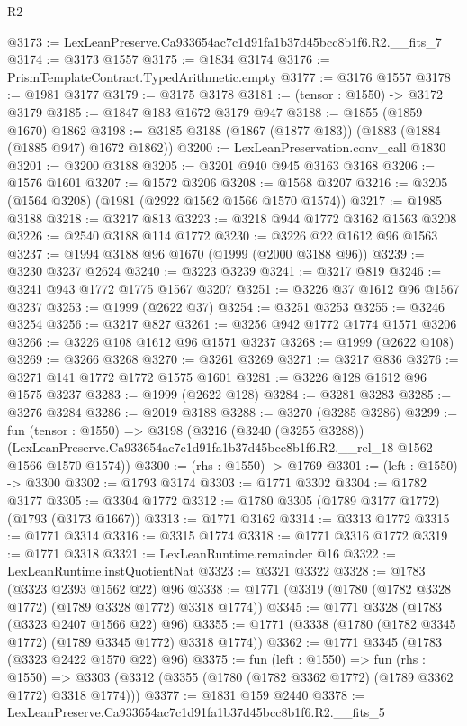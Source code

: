 \begin{lexlean}{R2}
\begin{coremodule}
@3173 := LexLeanPreserve.Ca933654ac7c1d91fa1b37d45bcc8b1f6.R2.__fits_7
@3174 := @3173 @1557
@3175 := @1834 @3174
@3176 := PrismTemplateContract.TypedArithmetic.empty
@3177 := @3176 @1557
@3178 := @1981 @3177
@3179 := @3175 @3178
@3181 := (tensor : @1550) -> @3172 @3179
@3185 := @1847 @183 @1672 @3179 @947
@3188 := @1855 (@1859 @1670) @1862
@3198 := @3185 @3188 (@1867 (@1877 @183)) (@1883 (@1884 (@1885 @947) @1672 @1862))
@3200 := LexLeanPreservation.conv_call @1830
@3201 := @3200 @3188
@3205 := @3201 @940 @945 @3163 @3168
@3206 := @1576 @1601
@3207 := @1572 @3206
@3208 := @1568 @3207
@3216 := @3205 (@1564 @3208) (@1981 (@2922 @1562 @1566 @1570 @1574))
@3217 := @1985 @3188
@3218 := @3217 @813
@3223 := @3218 @944 @1772 @3162 @1563 @3208
@3226 := @2540 @3188 @114 @1772
@3230 := @3226 @22 @1612 @96 @1563
@3237 := @1994 @3188 @96 @1670 (@1999 (@2000 @3188 @96))
@3239 := @3230 @3237 @2624
@3240 := @3223 @3239
@3241 := @3217 @819
@3246 := @3241 @943 @1772 @1775 @1567 @3207
@3251 := @3226 @37 @1612 @96 @1567 @3237
@3253 := @1999 (@2622 @37)
@3254 := @3251 @3253
@3255 := @3246 @3254
@3256 := @3217 @827
@3261 := @3256 @942 @1772 @1774 @1571 @3206
@3266 := @3226 @108 @1612 @96 @1571 @3237
@3268 := @1999 (@2622 @108)
@3269 := @3266 @3268
@3270 := @3261 @3269
@3271 := @3217 @836
@3276 := @3271 @141 @1772 @1772 @1575 @1601
@3281 := @3226 @128 @1612 @96 @1575 @3237
@3283 := @1999 (@2622 @128)
@3284 := @3281 @3283
@3285 := @3276 @3284
@3286 := @2019 @3188
@3288 := @3270 (@3285 @3286)
@3299 := fun (tensor : @1550) =>
  @3198
    (@3216
      (@3240 (@3255 @3288))
      (LexLeanPreserve.Ca933654ac7c1d91fa1b37d45bcc8b1f6.R2.__rel_18 @1562 @1566 @1570 @1574))
@3300 := (rhs : @1550) -> @1769
@3301 := (left : @1550) -> @3300
@3302 := @1793 @3174
@3303 := @1771 @3302
@3304 := @1782 @3177
@3305 := @3304 @1772
@3312 := @1780 @3305 (@1789 @3177 @1772) (@1793 (@3173 @1667))
@3313 := @1771 @3162
@3314 := @3313 @1772
@3315 := @1771 @3314
@3316 := @3315 @1774
@3318 := @1771 @3316 @1772
@3319 := @1771 @3318
@3321 := LexLeanRuntime.remainder @16
@3322 := LexLeanRuntime.instQuotientNat
@3323 := @3321 @3322
@3328 := @1783 (@3323 @2393 @1562 @22) @96
@3338 := @1771 (@3319 (@1780 (@1782 @3328 @1772) (@1789 @3328 @1772) @3318 @1774))
@3345 := @1771 @3328 (@1783 (@3323 @2407 @1566 @22) @96)
@3355 := @1771 (@3338 (@1780 (@1782 @3345 @1772) (@1789 @3345 @1772) @3318 @1774))
@3362 := @1771 @3345 (@1783 (@3323 @2422 @1570 @22) @96)
@3375 := fun (left : @1550) =>
  fun (rhs : @1550) =>
  @3303 (@3312 (@3355 (@1780 (@1782 @3362 @1772) (@1789 @3362 @1772) @3318 @1774)))
@3377 := @1831 @159 @2440
@3378 := LexLeanPreserve.Ca933654ac7c1d91fa1b37d45bcc8b1f6.R2.__fits_5

\end{coremodule}
\end{lexlean}
